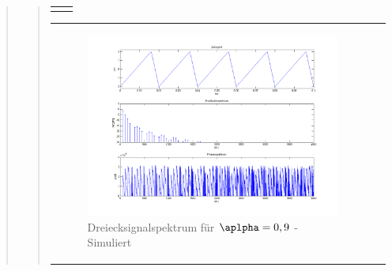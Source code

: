 \begin{quote}
\begin{quote}
\begin{center}
\begin{tabular}{ll}
\begin{minipage}{0.6\textwidth}
                \end{minipage}

            \end{tabular}
            \end{center}

            \begin{center}
            \begin{tabular}{ll}

            \hspace{-12em}
                \begin{minipage}{0.6\textwidth}

                    \begin{figure}[H]
                        \label{fig:}            
                        \includegraphics[scale=0.25]{./Bilder/drei_alpha9.png} %
                        \caption{Dreiecksignalspektrum für $\aplpha = 0,9$ - Simuliert}
                    \end{figure}

                \end{minipage}
                \begin{minipage}{0.6\textwidth}


\end{minipage}
\end{tabular}
\end{center}
\end{quote}
\end{quote}
